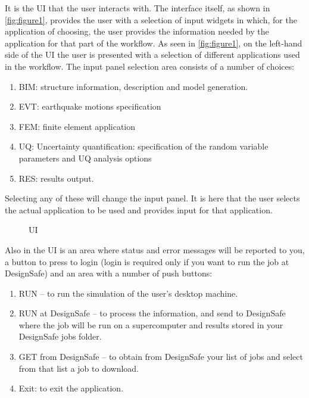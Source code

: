 
It is the UI that the user interacts with. The interface itself, as shown in \autoref{fig:figure1}, 
provides the user with a selection of input widgets in which, for the application of choosing, 
the user provides the information needed by the application for that part of the workflow. 
As seen in \autoref{fig:figure1}, on the left-hand side of the UI the user is presented with a selection of different applications used in the workflow. 
The input panel selection area consists of a number of choices:

\begin{enumerate}
  \item BIM: structure information, description and model generation.
  \item EVT: earthquake motions specification
  \item FEM: finite element application
  \item UQ: Uncertainty quantification: specification of the random variable parameters and UQ analysis options
  \item RES: results output.
\end{enumerate}


Selecting any of these will change the input panel. It is here that the user selects the actual application to be used and provides input for that application. 


\begin{figure}[!htbp]
  \caption{UI}
  \label{fig:figure1}
\end{figure}

Also in the UI is an area where status and error messages will be reported to you, a button to press to login (login is required only 
if you want to run the job at DesignSafe) and an area with a number of push buttons:
\begin{enumerate}
\item	RUN – to run the simulation of the user’s desktop machine.
\item	RUN at DesignSafe – to process the information, and send to DesignSafe where the job will be run on a supercomputer and results stored in your DesignSafe jobs folder.
\item	GET from DesignSafe – to obtain from DesignSafe your list of jobs and select from that list a job to download.
\item	Exit: to exit the application.
\end{enumerate}

